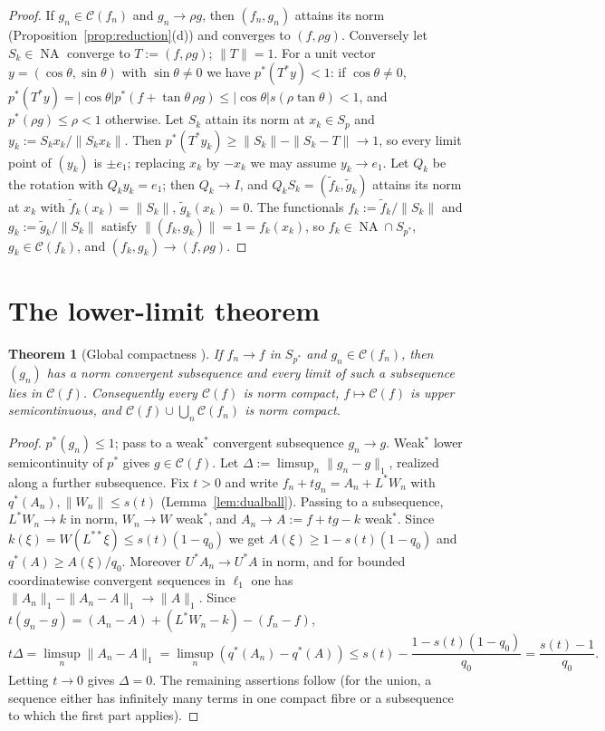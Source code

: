 \documentclass[10pt]{amsart}
\newtheorem{theorem}{Theorem}[section]
\theoremstyle{definition}
\theoremstyle{remark}
\newcommand{\NA}{\operatorname{NA}}
\newcommand{\Cset}{\mathcal C}
\begin{document}
\begin{proof}
If $g_n\in\Cset(f_n)$ and $g_n\to\rho g$, then $(f_n,g_n)$ attains its norm
(Proposition~\ref{prop:reduction}(d)) and converges to $(f,\rho g)$.
Conversely let $S_k\in\NA$ converge to $T:=(f,\rho g)$; $\|T\|=1$.  For a
unit vector $y=(\cos\theta,\sin\theta)$ with $\sin\theta\ne0$ we have
$p^*(T^*y)<1$: if $\cos\theta\ne0$,
$p^*(T^*y)=|\cos\theta|p^*(f+\tan\theta\,\rho g)\le|\cos\theta|s(\rho
\tan\theta)<1$, and $p^*(\rho g)\le\rho<1$ otherwise.  Let $S_k$ attain its
norm at $x_k\in S_p$ and $y_k:=S_kx_k/\|S_kx_k\|$.  Then
$p^*(T^*y_k)\ge\|S_k\|-\|S_k-T\|\to1$, so every limit point of $(y_k)$ is
$\pm e_1$; replacing $x_k$ by $-x_k$ we may assume $y_k\to e_1$.  Let $Q_k$
be the rotation with $Q_ky_k=e_1$; then $Q_k\to I$, and $Q_kS_k=(\tilde
f_k,\tilde g_k)$ attains its norm at $x_k$ with $\tilde
f_k(x_k)=\|S_k\|$, $\tilde g_k(x_k)=0$.  The functionals
$f_k:=\tilde f_k/\|S_k\|$ and $g_k:=\tilde g_k/\|S_k\|$ satisfy
$\|(f_k,g_k)\|=1=f_k(x_k)$, so $f_k\in\NA\cap S_{p^*}$, $g_k\in\Cset(f_k)$,
and $(f_k,g_k)\to(f,\rho g)$.
\end{proof}

\section{The lower-limit theorem}\label{sec:lowerlimit}

\begin{theorem}[Global compactness {\cite[Theorem~2.1]{PrA}}]\label{thm:compact}
If $f_n\to f$ in $S_{p^*}$ and $g_n\in\Cset(f_n)$, then $(g_n)$ has a norm
convergent subsequence and every limit of such a subsequence lies in
$\Cset(f)$.  Consequently every $\Cset(f)$ is norm compact, $f\mapsto\Cset(f)$
is upper semicontinuous, and $\Cset(f)\cup\bigcup_n\Cset(f_n)$ is norm
compact.
\end{theorem}

\begin{proof}
$p^*(g_n)\le1$; pass to a weak$^*$ convergent subsequence $g_n\to g$.
Weak$^*$ lower semicontinuity of $p^*$ gives $g\in\Cset(f)$.  Let
$\Delta:=\limsup_n\|g_n-g\|_1$, realized along a further subsequence.  Fix
$t>0$ and write $f_n+tg_n=A_n+L^*W_n$ with $q^*(A_n),\|W_n\|\le s(t)$
(Lemma~\ref{lem:dualball}).  Passing to a subsequence, $L^*W_n\to k$ in
norm, $W_n\to W$ weak$^*$, and $A_n\to A:=f+tg-k$ weak$^*$.  Since
$k(\xi)=W(L^{**}\xi)\le s(t)(1-q_0)$ we get $A(\xi)\ge1-s(t)(1-q_0)$ and
$q^*(A)\ge A(\xi)/q_0$.  Moreover $U^*A_n\to U^*A$ in norm, and for
bounded coordinatewise convergent sequences in $\ell_1$ one has
$\|A_n\|_1-\|A_n-A\|_1\to\|A\|_1$.  Since
$t(g_n-g)=(A_n-A)+(L^*W_n-k)-(f_n-f)$,
\[
 t\Delta=\limsup_n\|A_n-A\|_1=\limsup_n(q^*(A_n)-q^*(A))
 \le s(t)-\frac{1-s(t)(1-q_0)}{q_0}=\frac{s(t)-1}{q_0}.
\]
Letting $t\to0$ gives $\Delta=0$.  The remaining assertions follow
(for the union, a sequence either has infinitely many terms in one compact
fibre or a subsequence to which the first part applies).
\end{proof}
\end{document}
